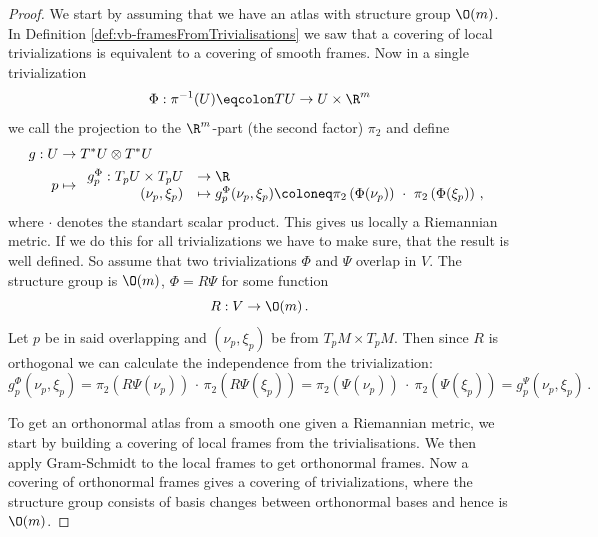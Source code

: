 \begin{proof}
	We start by assuming that we have an atlas with structure group $\O(m)$. In Definition \ref{def:vb-framesFromTrivialisations} we saw that a covering of local trivializations is equivalent to a covering of smooth frames. Now in a single trivialization 
	\begin{equation*}
		\Phi: \pi^{-1}(U)\eqcolon TU \to U\times \R^m
	\end{equation*} we call the projection to the $\R^m$-part (the second factor) $\pi_2$ and define 
\begin{align*}
	g: U &\to T^*U \otimes T^*U \\
	p&\mapsto  \begin{array}{rl}
		g_p^\Phi: T_pU\times T_pU &\to \R \\
		(\nu_p,\xi_p)    &\mapsto g_p^\Phi(\nu_p,\xi_p)\coloneq \pi_2\left(\Phi(\nu_p)\right)~\cdot~ \pi_2 \left(\Phi(\xi_p)\right)\,,
	\end{array} 
\end{align*} where $\cdot$ denotes the standart scalar product. This gives us locally a Riemannian metric. If we do this for all trivializations we have to make sure, that the result is well defined. So assume that two trivializations $\Phi$ and $\Psi$ overlap in $V$. The structure group is $\O(m)$, $\Phi=R\Psi$ for some function 
\begin{equation*}
	R: V\to \O(m)\,.
\end{equation*} Let $p$ be in said overlapping and $(\nu_p,\xi_p)$ be from $T_pM\times T_pM$. Then since $R$ is orthogonal we can calculate the independence from the trivialization:
\begin{equation*}
	g_p^\Phi(\nu_p,\xi_p)=\pi_2\left(R\Psi(\nu_p)\right)\,\cdot \, \pi_2 \left(R\Psi(\xi_p)\right)=\pi_2\left(\Psi(\nu_p)\right)~\cdot~ \pi_2 \left(\Psi(\xi_p)\right)=	g_p^\Psi(\nu_p,\xi_p)\,.
\end{equation*}

To get an orthonormal atlas from a smooth one given a Riemannian metric, we start by building a covering of local frames from the trivialisations. We then apply Gram-Schmidt to the local frames to get orthonormal frames. Now a covering of orthonormal frames gives a covering of trivializations, where the structure group consists of basis changes between orthonormal bases and hence is $\O(m)$.
\end{proof}

